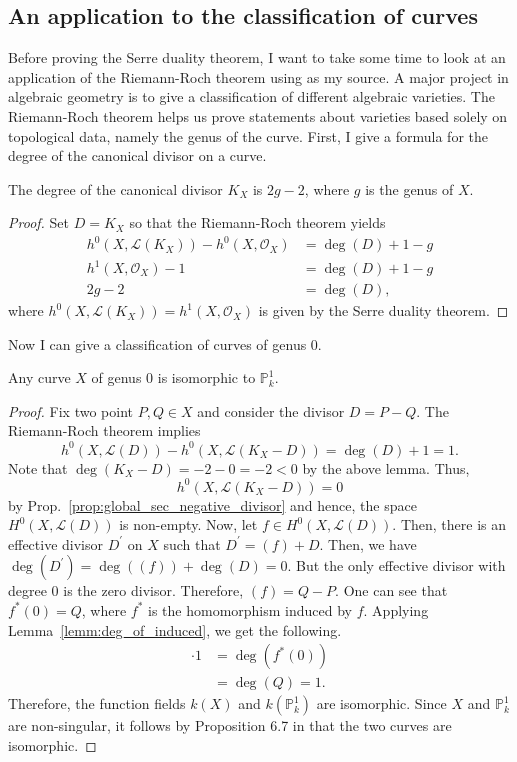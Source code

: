 \subsection{An application to the classification of curves}
Before proving the Serre duality theorem, I want to take some time to
look at an application of the Riemann-Roch theorem using \cite{hartshorne}
as my source. A major project in algebraic geometry is to give a
classification of different algebraic varieties. The Riemann-Roch theorem
helps us prove statements about varieties based solely on topological data,
namely the genus of the curve. First, I give a formula for the degree
of the canonical divisor on a curve.
\begin{lemm}
  The degree of the canonical divisor $K_{X}$ is $2g-2$, where $g$ is the
  genus of $X$.
\end{lemm}
\begin{proof}
  Set $D=K_{X}$ so that the Riemann-Roch theorem yields
  \begin{align*}
    h^{0}(X,\mathcal{L}(K_{X}))-h^{0}(X,\mathscr{O}_{X})&=\deg(D)+1-g \\
    h^{1}(X,\mathscr{O}_{X})-1&=\deg(D)+1-g \\
    2g-2&=\deg(D),
  \end{align*}
  where $h^{0}(X,\mathcal{L}(K_{X}))=h^{1}(X,\mathscr{O}_{X})$ is given
  by the Serre duality theorem.
\end{proof}
Now I can give a classification of curves of genus 0.
\begin{thm}
  Any curve $X$ of genus 0 is isomorphic to $\mathbb{P}^{1}_{k}$.
\end{thm}
\begin{proof}
  Fix two point $P,Q\in X$ and consider the divisor $D=P-Q$. The Riemann-Roch
  theorem implies
  \[
    h^{0}(X,\mathcal{L}(D))-h^{0}(X,\mathcal{L}(K_{X}-D))
    =\deg(D)+1=1.
  \]
  Note that $\deg(K_{X}-D)=-2-0=-2<0$ by the above lemma. Thus,
  \[
    h^{0}(X,\mathcal{L}(K_{X}-D))=0
  \]
  by Prop.~\ref{prop:global_sec_negative_divisor} and hence, the space
  $H^{0}(X,\mathcal{L}(D))$ is non-empty. Now, let
  $f\in H^{0}(X,\mathcal{L}(D))$. Then, there is an effective divisor
  $D^{\prime}$ on $X$ such that $D^{\prime}=(f)+D$. Then, we have
  $\deg\left(D^{\prime}\right)=\deg\left((f)\right)+\deg\left(D\right)=0$.
  But the only effective divisor with degree 0 is the zero divisor.
  Therefore, $(f)=Q-P$. One can see that $f^{\ast}(0)=Q$, where
  $f^{\ast}$ is the homomorphism induced by $f$. Applying
  Lemma~\ref{lemm:deg_of_induced}, we get the following.
  \begin{align*}
    [k(X):k(\mathbb{P}^{1})]\cdot 1
    &=\deg\left(f^{\ast}(0)\right) \\
    &=\deg(Q) = 1.
  \end{align*}
  Therefore, the function fields $k(X)$ and $k\left(\mathbb{P}^{1}_{k}\right)$
  are isomorphic. Since $X$ and $\mathbb{P}^{1}_{k}$ are non-singular,
  it follows by Proposition 6.7 in \cite{hartshorne} that the two curves
  are isomorphic.
\end{proof}
